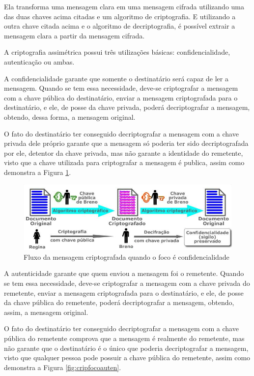 Ela transforma uma mensagem clara em uma mensagem cifrada utilizando uma das duas chaves acima citadas e um algoritmo de criptografia. E utilizando a outra chave citada acima e o algoritmo de decriptografia, é possível extrair a mensagem clara a partir da mensagem cifrada.

A criptografia assimétrica possui três utilizações básicas: confidencialidade, autenticação ou ambas.

A confidencialidade garante que somente o destinatário será capaz de ler a mensagem. Quando se tem essa necessidade, deve-se criptografar a mensagem com a chave pública do destinatário, enviar a mensagem criptografada para o destinatário, e ele, de posse da chave privada, poderá decriptografar a mensagem, obtendo, dessa forma, a mensagem original.

O fato do destinatário ter conseguido decriptografar a mensagem com a chave privada dele próprio garante que a mensagem só poderia ter sido decriptografada por ele, detentor da chave privada, mas não garante a identidade do remetente, visto que a chave utilizada para criptografar a mensagem é publica, assim como demonstra a Figura \ref{fig:cripfococonfi}.

\begin{figure}[H]
    \centering
    \caption{Fluxo da mensagem criptografada quando o foco é confidencialidade}
    \label{fig:cripfococonfi}
    \includegraphics[width=.8\linewidth]{Figuras/Confidencialidade.png}
\end{figure}

A autenticidade garante que quem enviou a mensagem foi o remetente. Quando se tem essa necessidade, deve-se criptografar a mensagem com a chave privada do remetente, enviar a mensagem criptografada para o destinatário, e ele, de posse da chave pública do remetente, poderá decriptografar a mensagem, obtendo, assim, a mensagem original.

O fato do destinatário ter conseguido decriptografar a mensagem com a chave pública do remetente comprova que a mensagem é realmente do remetente, mas não garante que o destinatário é o único que poderia decriptografar a mensagem, visto que qualquer pessoa pode possuir a chave pública do remetente, assim como demonstra a Figura \ref{fig:cripfocoauten}.

